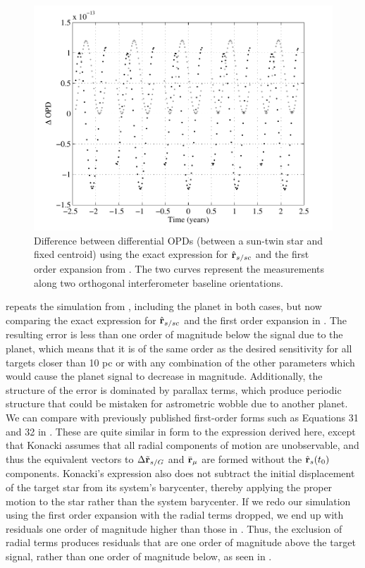 \begin{figure}[ht]
\centering
\includegraphics[width=5.5in]{./figures/first_order_expansion}
 \caption[First order expansion of astrometric observation]{ Difference between differential OPDs (between a sun-twin star and fixed centroid) using the exact expression for $\hat{\mathbf{r}}_{s/sc}$ and the first order expansion from . The two curves represent the measurements along two orthogonal interferometer baseline orientations.\label{fig:first_order_expansion}}
 \end{figure}
 repeats the simulation from , including the planet in both cases, but now comparing the exact expression for $\hat{\mathbf{r}}_{s/sc}$ and the first order expansion in .  The resulting error is less than one order of magnitude below the signal due to the planet, which means that it is of the same order as the desired sensitivity for all targets closer than 10 pc or with any combination of the other parameters which would cause the planet signal to decrease in magnitude.  Additionally, the structure of the error is dominated by parallax terms, which produce periodic structure that could be mistaken for astrometric wobble due to another planet.  We can compare  with previously published first-order forms such as Equations 31 and 32 in \citet{konacki2002frequency}.  These are quite similar in form to the expression derived here, except that Konacki assumes that all radial components of motion are unobservable, and thus the equivalent vectors to $\Delta \tilde{\mathbf{r}}_{s/G}$ and $\bar{\mathbf{r}}_\mu$ are formed without the $\hat{\mathbf{r}}_s(t_0)$ components.  Konacki's expression also does not subtract the initial displacement of the target star from its system's barycenter, thereby applying the proper motion to the star rather than the system barycenter.  If we redo our simulation using the first order expansion with the radial terms dropped, we end up with residuals one order of magnitude higher than those in .  Thus, the exclusion of radial terms produces residuals that are one order of magnitude above the target signal, rather than one order of magnitude below, as seen in .
